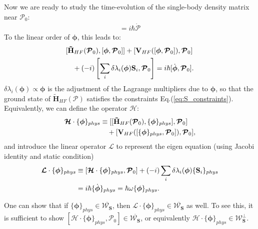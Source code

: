 \begin{subappendices}
Now we are ready to study the time-evolution of the single-body density matrix near $\boldsymbol{\mathcal P}_0$: 
\begin{align}
[\mathbf{\tilde H}_{HF}(\boldsymbol{\mathcal P}), \boldsymbol{\mathcal P}]=i\hbar\dot{\boldsymbol{\mathcal P}}
\end{align}
To the linear order of $\boldsymbol\phi$, this leads to:
\begin{align}
&[\mathbf {\tilde H}_{HF}(\boldsymbol{\mathcal P}_0),[\boldsymbol\phi,\boldsymbol{\mathcal P}_0]]+[\mathbf V_{HF}([\boldsymbol\phi,\boldsymbol{\mathcal P}_0]),\boldsymbol{\mathcal P}_0]\notag\\
&\quad+(-i)\left[\sum_i\delta\lambda_i(\boldsymbol\phi) \mathbf S_i,\boldsymbol{\mathcal P}_0\right]=i\hbar [\dot{\boldsymbol\phi},\boldsymbol{\mathcal P}_0].
\end{align}
$\delta\lambda_i(\boldsymbol\phi)\propto \boldsymbol\phi$ is the adjustment of the Lagrange multipliers due to $\boldsymbol\phi$, so that the ground state of $\mathbf{\tilde H}_{HF}(\boldsymbol{\mathcal P})$ satisfies the constraints Eq.(\ref{eq:S_constraints}).
Equivalently, we can define the operator $\boldsymbol{\mathcal H}$:
\begin{align}
\boldsymbol{\mathcal H} \cdot \{\boldsymbol\phi\}_{phys} &\equiv [[\mathbf {\tilde H}_{HF}(\boldsymbol{\mathcal P}_0),\{\boldsymbol\phi\}_{phys}],\boldsymbol{\mathcal P}_0]\notag\\
&\quad+[\mathbf V_{HF}([\{\boldsymbol\phi\}_{phys},\boldsymbol{\mathcal P}_0]),\boldsymbol{\mathcal P}_0], \label{eq:H_eigen}
\end{align}
and introduce the linear operator $\boldsymbol{\mathcal L}$ to represent the eigen equation (using Jacobi identity and static condition)
\begin{align}
\boldsymbol{\mathcal L}\cdot \{\boldsymbol\phi\}_{phys}&\equiv [\boldsymbol{\mathcal H} \cdot \{\boldsymbol\phi\}_{phys},\boldsymbol{\mathcal P}_0]+(-i)\sum_i\delta\lambda_i(\boldsymbol\phi) \{\mathbf S_i\}_{phys}\notag\\
&=i\hbar\{\dot{\boldsymbol\phi}\}_{phys}=\hbar\omega\{\boldsymbol\phi\}_{phys} .\label{eq:L_eigen}
\end{align}

One can show that if $\{\boldsymbol\phi\}_{phys}\in \overline{\boldsymbol{\mathcal W}_{\mathbf S}}$, then $\boldsymbol{\mathcal L}\cdot \{\boldsymbol\phi\}_{phys}\in \overline{\boldsymbol{\mathcal W}_{\mathbf S}}$ as well. To see this, it is sufficient to show $[\boldsymbol{\mathcal H} \cdot \{\boldsymbol\phi\}_{phys},\boldsymbol{\mathcal P}_0]\in \overline{\boldsymbol{\mathcal W}_{\mathbf S}}$, or equivalently $\boldsymbol{\mathcal H} \cdot \{\boldsymbol\phi\}_{phys}\in \boldsymbol{\mathcal W}_{\mathbf S}^{\perp}$.


\end{subappendices}
